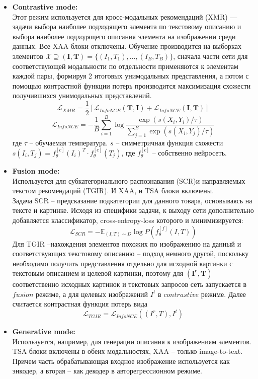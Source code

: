 \documentclass[a4paper,14pt]{extarticle}
\begin{document}
				\begin{itemize}
					\item[]\textbf{Contrastive mode:}\\
					Этот режим используется для кросс-модальных рекомендаций (XMR) --- задачи выбора наиболее подходящего элемента по текстовому описанию и выбора наиболее подходящего описания элемента на изображении среди данных. Все XAA блоки отключены. Обучение производится на выборках элементов $\mathcal{X} \supseteq (\textbf{I}, \textbf{T}) = \{(I_1, T_1), \dots, (I_B, T_B)\}$, сначала части сети для соответствующей модальности по отдельности применяются к элементам каждой пары, формируя 2 итоговых унимодальных представления, а потом с помощью контрастной функции потерь \cite{https://doi.org/10.48550/arXiv.2004.11362} производится максимизация схожести получившихся унимодальных представлений.
					$$\mathcal{L}_{XMR} = \frac{1}{2} [\mathcal{L}_{InfoNCE}(\mathbf{T}, \mathbf{I}) + \mathcal{L}_{InfoNCE}(\mathbf{I}, \mathbf{T})]$$
					$$\mathcal{L}_{InfoNCE} = -\frac{1}{B}\sum\limits_{i=1}^{B}\log\frac{\exp(s(X_i, Y_i)/\tau)}{\sum_{j=1}^B\exp(s(X_i, Y_j)/\tau)}$$
					где $\tau$ -- обучаемая температура. $s$ -- симметричная функция схожести $s(I_i, T_j) = f_\theta^{[c]}(I_i)^T\cdot f_\theta^{[c]}(T_j)$, где $f_\theta^{[c]}$ -- собственно нейросеть.
					\item[]\textbf{Fusion mode:}\\
					Используется для субкатегориального распознавания (SCR)и направляемых текстом рекомендаций (TGIR). И XAA, и TSA блоки включены. \\
					Задача SCR -- предсказание подкатегории для данного товара, основываясь на тексте и картинке. Исходя из специфики задачи, к выходу сети дополнительно добавляется классификатор, cross-entropy-loss которого и минимизируется:
					$$\mathcal{L}_{SCR} = -\mathbb{E}_{(I,T)\sim D}\log P\left(f_\theta^{[f]}(I, T)\right)$$
					Для TGIR --нахождения элементов похожих по изображению на данный и соответствующих текстовому описанию -- подход немного другой, поскольку необходимо получить представления отдельно для исходной картинки с текстовым описанием и целевой картинки, поэтому для $(\mathbf{I^r}, \mathbf{T})$ соответственно исходных картинок и текстовых запросов сеть запускается в $fusion$ режиме, а для целевых изображений $I^t$ в $contrastive$ режиме. Далее считается контрастная функция потерь вида
					$$\mathcal{L}_{TGIR} = \mathcal{L}_{InfoNCE}((I^r,T), I^t)$$
					
					\item[]\textbf{Generative mode:}\\
					Используется, например, для генерации описания к изображениям элементов. TSA блоки включены в обеих модальностях, XAA -- только image-to-text. Причем часть обрабатывающая входное изображение используется как энкодер, а вторая -- как декодер в авторегрессионном режиме.
				\end{itemize}
			
\end{document}
